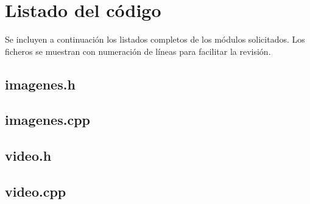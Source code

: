 \section{Listado del código}

Se incluyen a continuación los listados completos de los módulos solicitados. Los ficheros se muestran con numeración de líneas para facilitar la revisión.

\subsection{imagenes.h}


\subsection{imagenes.cpp}


\subsection{video.h}


\subsection{video.cpp}


